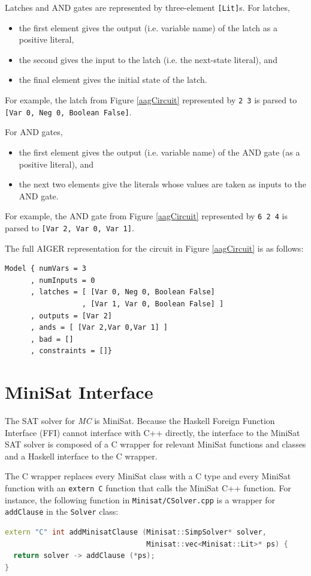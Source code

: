 \documentclass[12pt,a4paper,twoside,openright]{report}
\begin{document}
{{Latches and AND gates are represented by three-element \verb,[Lit],s. For latches,
\begin{itemize}
\item the first element gives the output (i.e. variable name)
of the latch as a positive literal,
\item the second gives the input to the latch (i.e. the next-state literal), and
\item the final element gives the initial state
of the latch.
\end{itemize}
For example, the latch from Figure \ref{aagCircuit} represented by \verb,2 3, is parsed
to \verb.[Var 0, Neg 0, Boolean False]..

For AND gates,
\begin{itemize}
\item the first element gives the output (i.e. variable name) of the AND gate
(as a positive literal), and
\item the next two elements give the literals whose values are taken
as inputs to the AND gate.
\end{itemize}
For example, the AND gate from Figure \ref{aagCircuit} represented by \verb,6 2 4, is
parsed to \verb.[Var 2, Var 0, Var 1]..

The full AIGER representation for the circuit in Figure \ref{aagCircuit} is
as follows:
\begin{lstlisting}
Model { numVars = 3
      , numInputs = 0
      , latches = [ [Var 0, Neg 0, Boolean False]
                  , [Var 1, Var 0, Boolean False] ]
      , outputs = [Var 2]
      , ands = [ [Var 2,Var 0,Var 1] ]
      , bad = []
      , constraints = []}
\end{lstlisting}

\section{MiniSat Interface}
\label{impl:minisat}

The SAT solver for \emph{MC} is MiniSat.
Because the Haskell Foreign Function Interface (FFI) cannot interface with C++ directly,
the interface to the MiniSat SAT solver is composed of a C wrapper for relevant
MiniSat functions and classes and a Haskell interface to the C wrapper.

The C wrapper replaces every MiniSat class with a C type and every MiniSat function with
an \verb,extern C, function that calls the MiniSat C++ function.
For instance, the following function
in \verb,Minisat/CSolver.cpp, is a wrapper for \verb,addClause, in the \verb,Solver,
class:
\begin{lstlisting}[language = C++]
extern "C" int addMinisatClause (Minisat::SimpSolver* solver,
                                 Minisat::vec<Minisat::Lit>* ps) {
  return solver -> addClause (*ps);
}
\end{lstlisting}

}}
\end{document}
